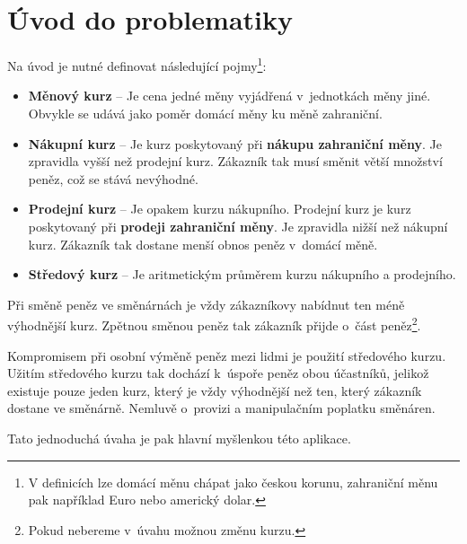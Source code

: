 \chapter{Úvod do problematiky}
\label{problematics}

Na úvod je nutné definovat následující pojmy\footnote{V definicích lze domácí měnu chápat jako českou korunu, zahraniční měnu pak například Euro nebo americký dolar.}:
\begin{itemize}
    \item \textbf{Měnový kurz} -- Je cena jedné měny vyjádřená v~jednotkách měny jiné. Obvykle se udává jako poměr domácí měny ku měně zahraniční.
    \item \textbf{Nákupní kurz} -- Je kurz poskytovaný při \textbf{nákupu zahraniční měny}. Je zpravidla vyšší než prodejní kurz. Zákazník tak musí směnit větší množství peněz, což se stává nevýhodné.
    \item \textbf{Prodejní kurz} -- Je opakem kurzu nákupního. Prodejní kurz je kurz poskytovaný při \textbf{prodeji zahraniční měny}. Je zpravidla nižší než nákupní kurz. Zákazník tak dostane menší obnos peněz v~domácí měně.
    \item \textbf{Středový kurz} -- Je aritmetickým průměrem kurzu nákupního a prodejního.
\end{itemize}

Při směně peněz ve směnárnách je vždy zákazníkovy nabídnut ten méně výhodnější kurz. Zpětnou směnou peněz tak zákazník přijde o~část peněz\footnote{Pokud nebereme v~úvahu možnou změnu kurzu.}.

Kompromisem při osobní výměně peněz mezi lidmi je použití středového kurzu. Užitím středového kurzu tak dochází k~úspoře peněz obou účastníků, jelikož existuje pouze jeden kurz, který je vždy výhodnější než ten, který zákazník dostane ve směnárně. Nemluvě o~provizi a manipulačním poplatku směnáren.

Tato jednoduchá úvaha je pak hlavní myšlenkou této aplikace.

